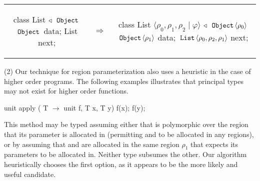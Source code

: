 \begin{tabular}{ccc}
\begin{minipage}{0.35\linewidth}
\begin{codejava}
class List $\triangleleft$ $\,{\tt Object}\,$
{
  $\,{\tt Object}\,$ data;
  List next;
}
\end{codejava}
\end{minipage}
&
$\Rightarrow$
&
\begin{minipage}{0.65\linewidth}
\begin{codejava}
class List $\langle \rho_0, \rho_1, \rho_2 \; | \; \varphi \rangle$ $\triangleleft$ $\,{\tt Object}\, \langle \rho_0 \rangle$
{
  $\,{\tt Object}\, \langle \rho_1 \rangle$ data;
  $\,{\tt List}\, \langle \rho_0, \rho_2, \rho_1 \rangle$ next;
}
\end{codejava}
\end{minipage}
\end{tabular}

  (2) Our technique for region parameterization also uses a heuristic in the case of
higher order programs. The following examples illustrates that principal types may
not exist for higher order functions.
\begin{codejava}
    unit apply ( T $\rightarrow$ unit f, T x, T y) { f(x); f(y); }
\end{codejava}
This method may be typed assuming either that  is polymorphic over the region
that its parameter is allocated in (permitting  and  to be allocated in any
regions), or by assuming that  and  are allocated in the same region $\rho_1$
that  expects its parameters to be allocated in. Neither type subsumes the other.
Our algorithm heuristically chooses the first option, as it appears to be the more likely
and useful candidate.



